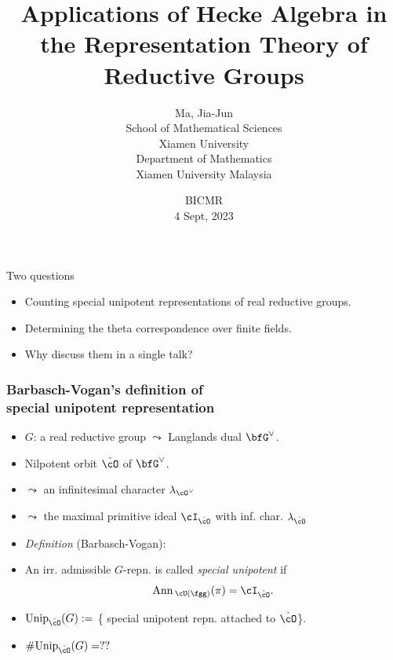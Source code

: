 \documentclass[t,mathserif,11pt,usenames,dvipsnames]{beamer}
\title[Hecke algebra]{Applications of Hecke Algebra in the Representation Theory
  of Reductive Groups}
\author[Ma, Jia-Jun]{Ma, Jia-Jun\\[.5em]
  {
    \scriptsize{
    School of Mathematical Sciences\\
    Xiamen University\\
    Department of Mathematics\\
    Xiamen University Malaysia}
  }
}
\date{BICMR \\ 4 Sept, 2023 }
\theoremstyle{plain}
\theoremstyle{definition}
\newcommand{\bfone}{\mathbf{1}}
\newcommand{\bbone}{\mathbb{1}}
\def\Ann{{\mathrm{Ann}\,}}
\def\Unip{{\mathrm{Unip}}}
\def\ckcO{{\check{\cO}}}
\def\blue{\color{blue}}
\let\oldemph\emph
\def\emph#1{\oldemph{\blue #1}}
\begin{document}
\begin{frame}[plain,label=tt]
    
  \titlepage
\end{frame}

\def\bbone{\bfone}

\begin{frame}{Two questions}
  \begin{itemize}
    \item Counting special unipotent representations of real reductive groups.
    \item Determining the theta correspondence over finite fields. \pause
    \item Why discuss them in a single talk?
  \end{itemize}
\end{frame}




\begin{frame}[label=DU]
  \frametitle{Barbasch-Vogan's definition of\\ special unipotent representation}
  \begin{itemize}
    \item[] $G$: a real reductive group $\leadsto$ Langlands dual
          $\bfG^{\vee}$.\pause
    \item[] Nilpotent orbit $\ckcO$ of $\bfG^\vee$.
    \item[] \hspace{1em} $\leadsto$ an infinitesimal character
          $\lambda_{\cO^\vee}$

    \item[] \hspace{1em} $\leadsto$ the maximal primitive ideal $\cI_\ckcO$ with
          inf. char. $\lambda_{\ckcO}$\pause
    \item \emph{Definition} (Barbasch-Vogan):
    \item [] An irr. admissible $G$-repn. is called \emph{special unipotent} if
          \[
          \Ann_{\cU(\fgg)}(\pi) = \cI_{\ckcO}.
          \]
    \item $\Unip_{\ckcO}(G):=$ \{ special unipotent repn. attached to
          $\ckcO$\}.\pause
    \item {\color{red} $\# \Unip_{\ckcO}(G) = ??$}
  \end{itemize}
\end{frame}
\end{document}
